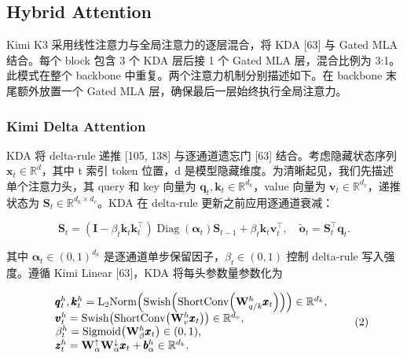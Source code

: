 \documentclass[
  10
]{article}
\begin{document}
\subsection{Hybrid Attention}\label{hybrid-attention}

Kimi K3 采用线性注意力与全局注意力的逐层混合，将 KDA {[}63{]} 与 Gated MLA 结合。每个 block 包含 3 个 KDA 层后接 1 个 Gated MLA 层，混合比例为 3:1。此模式在整个 backbone 中重复。两个注意力机制分别描述如下。在 backbone 末尾额外放置一个 Gated MLA 层，确保最后一层始终执行全局注意力。

\subsubsection{Kimi Delta Attention}\label{kimi-delta-attention}

KDA 将 delta-rule 递推 {[}105, 138{]} 与逐通道遗忘门 {[}63{]} 结合。考虑隐藏状态序列 \(\pmb { x } _ { t } \in \mathbb { R } ^ { d }\)，其中 t 索引 token 位置，d 是模型隐藏维度。为清晰起见，我们先描述单个注意力头，其 query 和 key 向量为 \(\boldsymbol { q } _ { t } , \boldsymbol { k } _ { t } \in \mathbb { R } ^ { d _ { k } }\)，value 向量为 \(\pmb { v } _ { t } \in \mathbb { R } ^ { d _ { v } }\)，递推状态为 \(\mathbf { S } _ { t } \in \mathbb { R } ^ { d _ { k } \times d _ { v } }\)。KDA 在 delta-rule 更新之前应用逐通道衰减：

\[
\mathbf {S} _ {t} = \left(\mathbf {I} - \beta_ {t} \boldsymbol {k} _ {t} \boldsymbol {k} _ {t} ^ {\top}\right) \operatorname{Diag} (\boldsymbol {\alpha} _ {t}) \mathbf {S} _ {t - 1} + \beta_ {t} \boldsymbol {k} _ {t} \boldsymbol {v} _ {t} ^ {\top}, \quad \tilde {\boldsymbol {o}} _ {t} = \mathbf {S} _ {t} ^ {\top} \boldsymbol {q} _ {t}.\tag{1}
\]

其中 \(\pmb { \alpha } _ { t } \in ( 0 , 1 ) ^ { d _ { k } }\) 是逐通道单步保留因子，\(\beta _ { t } \in ( 0 , 1 )\) 控制 delta-rule 写入强度。遵循 Kimi Linear {[}63{]}，KDA 将每头参数量参数化为

\[
\begin{array}{r l} & {\pmb {q} _ {t} ^ {h}, \pmb {k} _ {t} ^ {h} = \mathrm{L} _ {2} \mathrm{Norm} \Big (\mathrm{Swish} \Big (\mathrm{ShortConv} \Big (\mathbf {W} _ {q / k} ^ {h} \pmb {x} _ {t} \Big) \Big) \Big) \in \mathbb {R} ^ {d _ {k}},} \\ & {\pmb {v} _ {t} ^ {h} = \mathrm{Swish} \big (\mathrm{ShortConv} \big (\mathbf {W} _ {v} ^ {h} \pmb {x} _ {t} \big) \big) \in \mathbb {R} ^ {d _ {v}},} \\ & {\beta_ {t} ^ {h} = \mathrm{Sigmoid} \big (\mathbf {W} _ {\beta} ^ {h} \pmb {x} _ {t} \big) \in (0, 1),} \\ & {\pmb {z} _ {t} ^ {h} = \mathbf {W} _ {\alpha} ^ {\uparrow} \mathbf {W} _ {\alpha} ^ {\downarrow} \pmb {x} _ {t} + \pmb {b} _ {\alpha} ^ {h} \in \mathbb {R} ^ {d _ {k}}.} \end{array}\tag{2}
\]
\end{document}
